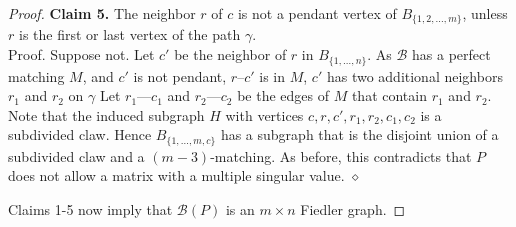 \documentclass[10pt,a4paper]{amsart}
\begin{document}
\begin{proof}
\bigskip\noindent
{\bf Claim 5.}  The neighbor $r$  of $c$ is not a pendant vertex
of $B_{\{1,2,\ldots, m\}}$, unless $r$ is the 
first or last vertex of the path $\gamma$. 
\\ [12pt]
Proof. 
Suppose not. Let $c'$ be the neighbor of $r$ in $B_{\{1,\ldots, n\}}$.  As $\mathcal{B}$ has a perfect matching $M$,
and $c'$ is not pendant,  $r$--$c'$ is in $M$, $c'$ has two additional neighbors $r_1$ and $r_2$ on $\gamma$  Let $r_1$---$c_1$ and $r_2$---$c_2$ be the edges of $M$ that contain $r_1$ and $r_2$.
Note that  the induced subgraph $H$ with vertices $c,r,c',r_1,r_2,c_1,c_2$
is a subdivided claw. Hence $B_{\{1,\ldots, m,c\}}$
has a subgraph that is the disjoint union of a subdivided claw 
and a $(m-3)$-matching.  As before, this contradicts that $P$ does not
allow a matrix with a multiple singular value. \hfill $\diamond$ 



\bigskip\noindent
Claims 1-5 now imply that $\mathcal{B}(P)$ is an $m\times n$ Fiedler graph.
\end{proof}
\end{document}
